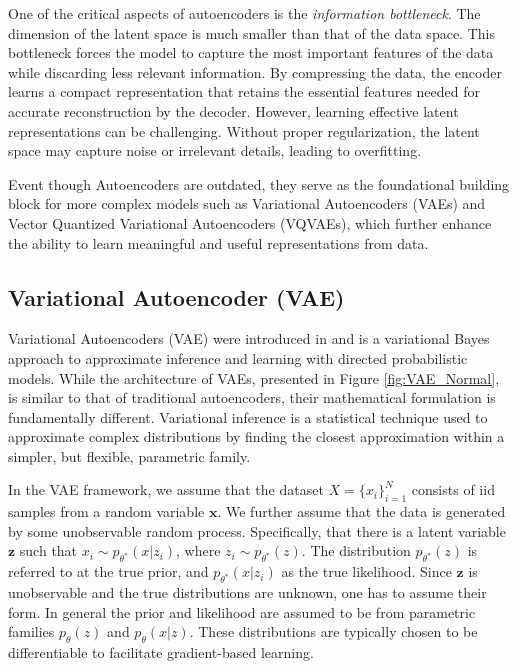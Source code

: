 \documentclass[../../thesis.tex]{subfiles}
\begin{document}
One of the critical aspects of autoencoders is the \textit{information bottleneck}. The dimension of the latent space is much smaller than that of the data space. This bottleneck forces the model to capture the most important features of the data while discarding less relevant information. By compressing the data, the encoder learns a compact representation that retains the essential features needed for accurate reconstruction by the decoder. However, learning effective latent representations can be challenging. Without proper regularization, the latent space may capture noise or irrelevant details, leading to overfitting.\newline

Event though Autoencoders are outdated, they serve as the foundational building block for more complex models such as Variational Autoencoders (VAEs) and Vector Quantized Variational Autoencoders (VQVAEs), which further enhance the ability to learn meaningful and useful representations from data.

\subsection{Variational Autoencoder (VAE)}
Variational Autoencoders (VAE) were introduced in \cite{kingma2022autoencoding} and is a variational Bayes approach to approximate inference and learning with directed probabilistic models. While the architecture of VAEs, presented in Figure \ref{fig:VAE_Normal}, is similar to that of traditional autoencoders, their mathematical formulation is fundamentally different. Variational inference is a statistical technique used to approximate complex distributions by finding the closest approximation within a simpler, but flexible, parametric family. \newline 

In the VAE framework, we assume that the dataset $X = \{x_i\}_{i=1}^{N}$ consists of iid samples from a random variable $\mathbf{x}$. We further assume that the data is generated by some unobservable random process. Specifically, that there is a latent variable $\mathbf{z}$ such that $x_i \sim p_{\theta^*}(x|z_i)$, where $z_i \sim p_{\theta^*}(z)$. The distribution $p_{\theta^*}(z)$ is referred to at the true prior, and $p_{\theta^*}(x|z_i)$ as the true likelihood. Since $\mathbf{z}$ is unobservable and the true distributions are unknown, one has to assume their form. In general the prior and likelihood are assumed to be from parametric families $p_{\theta}(z)$ and $p_{\theta}(x|z)$. These distributions are typically chosen to be differentiable to facilitate gradient-based learning.\newline
\end{document}
